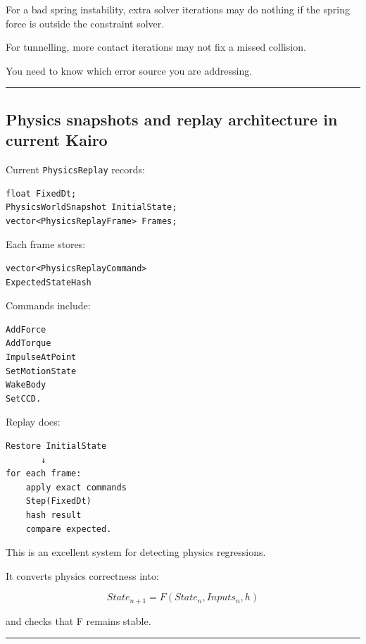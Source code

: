 For a bad spring instability, extra solver iterations may do nothing if the spring force is outside the constraint solver.

For tunnelling, more contact iterations may not fix a missed collision.

You need to know which error source you are addressing.

\begin{center}\rule{0.5\linewidth}{0.5pt}\end{center}

\subsection{Physics snapshots and replay architecture in current Kairo}\label{06-engine-ii-ch038-physics-snapshots-and-replay-architecture-in-current-kairo}

Current \texttt{PhysicsReplay} records:

\begin{verbatim}
float FixedDt;
PhysicsWorldSnapshot InitialState;
vector<PhysicsReplayFrame> Frames;
\end{verbatim}

Each frame stores:

\begin{verbatim}
vector<PhysicsReplayCommand>
ExpectedStateHash
\end{verbatim}

Commands include:

\begin{verbatim}
AddForce
AddTorque
ImpulseAtPoint
SetMotionState
WakeBody
SetCCD.
\end{verbatim}

Replay does:

\begin{verbatim}
Restore InitialState
       ↓
for each frame:
    apply exact commands
    Step(FixedDt)
    hash result
    compare expected.
\end{verbatim}

This is an excellent system for detecting physics regressions.

It converts physics correctness into:

\[
\boxed{
State_{n+1}
=
F(State_n,Inputs_n,h)
}
\]

and checks that F remains stable.

\begin{center}\rule{0.5\linewidth}{0.5pt}\end{center}

